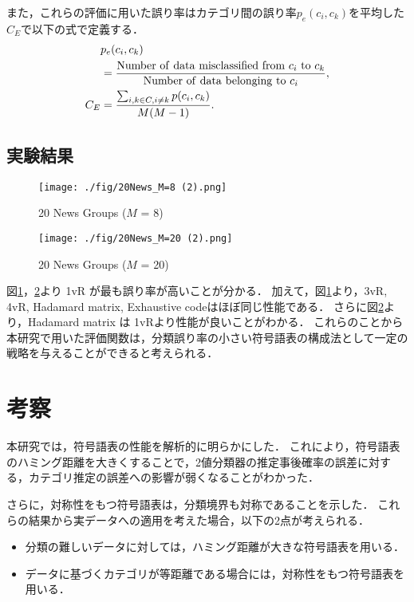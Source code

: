 \documentclass{jarticle}
\theoremstyle{definition}
\begin{document}
また，これらの評価に用いた誤り率はカテゴリ間の誤り率$p_e(c_i,c_k)$を平均した$C_E$で以下の式で定義する．
\begin{align}
    &p_e(c_i,c_k) \nonumber\\&= \frac{{\rm Number\ of\ data\ misclassified\ from}\ c_i\ {\rm to}\ c_k}{{\rm Number\ of\ data\ belonging\ to}\ c_i},\\
    C_E &= \frac{\sum_{i,k \in C,i \neq k} p(c_i,c_k)}{M(M -1)}.
\end{align}

\subsection{実験結果}
\begin{figure}[!t]
\begin{center}
\texttt{[image: ./fig/20News\_M=8 (2).png]} 
\caption{20 News Groups ($M$ = 8)}
\label{fig:20_News_M=8}
\end{center}
\end{figure}

\begin{figure}[!t]
\begin{center}
\texttt{[image: ./fig/20News\_M=20 (2).png]} 
\caption{20 News Groups ($M$ = 20)}
\label{fig:20_News_M=20}
\end{center}
\end{figure}

図\ref{fig:20_News_M=8}，\ref{fig:20_News_M=20}より 1vR が最も誤り率が高いことが分かる．
加えて，図\ref{fig:20_News_M=8}より，3vR, 4vR, Hadamard matrix, Exhaustive codeはほぼ同じ性能である．
さらに図\ref{fig:20_News_M=20}より，Hadamard matrix は 1vRより性能が良いことがわかる．
これらのことから本研究で用いた評価関数は，分類誤り率の小さい符号語表の構成法として一定の戦略を与えることができると考えられる．

\section{考察}
本研究では，符号語表の性能を解析的に明らかにした．
これにより，符号語表のハミング距離を大きくすることで，2値分類器の推定事後確率の誤差に対する，カテゴリ推定の誤差への影響が弱くなることがわかった．

さらに，対称性をもつ符号語表は，分類境界も対称であることを示した．
これらの結果から実データへの適用を考えた場合，以下の2点が考えられる．
\begin{itemize}
    \item 分類の難しいデータに対しては，ハミング距離が大きな符号語表を用いる．
    \item データに基づくカテゴリが等距離である場合には，対称性をもつ符号語表を用いる．
\end{itemize}
\end{document}
